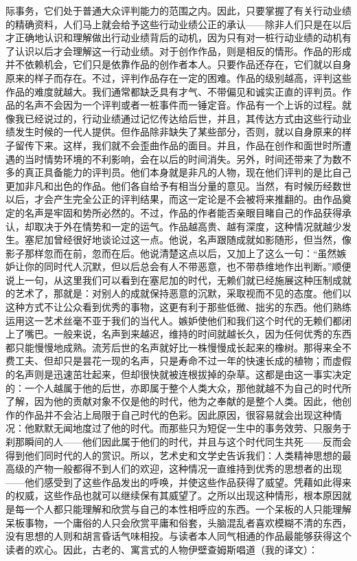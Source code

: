 \documentclass[12pt,oneside]{book}
\begin{document}
际事务，它们处于普通大众评判能力的范围之内。因此，只要掌握了有关行动业绩的精确资料，人们马上就会给予这些行动业绩公正的承认——除非人们只是在以后才正确地认识和理解做出行动业绩背后的动机，因为只有对一桩行动业绩的动机有了认识以后才会理解这一行动业绩。对于创作作品，则是相反的情形。作品的形成并不依赖机会，它们只是依靠作品的创作者本人。只要作品还存在，它们就以自身原来的样子而存在。不过，评判作品存在一定的困难。作品的级别越高，评判这些作品的难度就越大。我们通常都缺乏具有才气、不带偏见和诚实正直的评判员。作品的名声不会因为一个评判或者一桩事件而一锤定音。作品有一个上诉的过程。就像我已经说过的，行动业绩通过记忆传达给后世，并且，其传达方式由这些行动业绩发生时候的一代人提供。但作品除非缺失了某些部分，否则，就以自身原来的样子留传下来。这样，我们就不会歪曲作品的面目。并且，作品在创作和面世时所遭遇的当时情势环境的不利影响，会在以后的时间消失。另外，时间还带来了为数不多的真正具备能力的评判员。他们本身就是非凡的人物，现在他们评判的是比自己更加非凡和出色的作品。他们各自给予有相当分量的意见。当然，有时候历经数世以后，才会产生完全公正的评判结果，而这一定论是不会被将来推翻的。由作品奠定的名声是牢固和势所必然的。不过，作品的作者能否亲眼目睹自己的作品获得承认，却取决于外在情势和一定的运气。作品越高贵、越有深度，这种情况就越少发生。塞尼加曾经很好地谈论过这一点。他说，名声跟随成就如影随形，但当然，像影子那样忽而在前，忽而在后。他说清楚这点以后，又加上了这么一句：“虽然嫉妒让你的同时代人沉默，但以后总会有人不带恶意，也不带恭维地作出判断。”顺便说上一句，从这里我们可以看到在塞尼加的时代，无赖们就已经施展这种压制成就的艺术了，那就是：对别人的成就保持恶意的沉默，采取视而不见的态度。他们以这种方式不让公众看到优秀的事物，这更有利于那些低微、拙劣的东西。他们熟练运用这一艺术丝毫不亚于我们的当代人。嫉妒使他们和我们这个时代的无赖们都闭上了嘴巴。一般来说，名声到来越迟，维持的时间就越长久，因为任何优秀的东西都只能慢慢地成熟。流芳后世的名声就好比一株慢慢成长起来的橡树。那得来全不费工夫、但却只是昙花一现的名声，只是寿命不过一年的快速长成的植物；而虚假的名声则是迅速茁壮起来，但却很快就被连根拔掉的杂草。这都是由这一事实决定的：一个人越属于他的后世，亦即属于整个人类大众，那他就越不为自己的时代所了解，因为他的贡献对象不仅是他的时代，他为之奉献的是整个人类。因此，他创作的作品并不会沾上局限于自己时代的色彩。因此原因，很容易就会出现这种情况：他默默无闻地度过了他的时代。而那些只为短促一生中的事务效劳、只服务于刹那瞬间的人——他们因此属于他们的时代，并且与这个时代同生共死——反而会得到他们同时代的人的赏识。所以，艺术史和文学史告诉我们：人类精神思想的最高级的产物一般都得不到人们的欢迎，这种情况一直维持到优秀的思想者的出现——他们感受到了这些作品发出的呼唤，并使这些作品获得了威望。凭藉如此得来的权威，这些作品也就可以继续保有其威望了。之所以出现这种情形，根本原因就是每一个人都只能理解和欣赏与自己的本性相呼应的东西。一个呆板的人只能理解呆板事物，一个庸俗的人只会欣赏平庸和俗套，头脑混乱者喜欢模糊不清的东西，没有思想的人则和胡言昏话气味相投。与读者本人同气相通的作品最能够获得这个读者的欢心。因此，古老的、寓言式的人物伊壁查姆斯唱道（我的译文）： 
\end{document}
